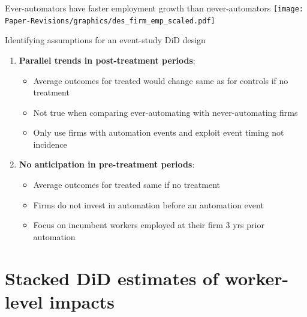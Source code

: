 \documentclass[aspectratio=169]{beamer}
\begin{document}
\begin{frame}{Ever-automators have faster employment growth than never-automators}
\centering
\texttt{[image: Paper-Revisions/graphics/des\_firm\_emp\_scaled.pdf]}
\end{frame}

\begin{frame}{Identifying assumptions for an event-study DiD design}
    \begin{enumerate}
        \item<1-> \textbf{Parallel trends in post-treatment periods}: \medskip
        \begin{itemize}
            \item Average outcomes for treated would change same as for controls if no treatment \medskip
            \item Not true when comparing ever-automating with never-automating firms \medskip
            \item Only use firms with automation events and exploit event timing not incidence \medskip
        \end{itemize}
        \item<2-> \textbf{No anticipation in pre-treatment periods}: \medskip
        \begin{itemize}
            \item Average outcomes for treated same if no treatment \medskip
            \item Firms do not invest in automation before an automation event \medskip
            \item Focus on incumbent workers employed at their firm 3 yrs prior automation
        \end{itemize}
    \end{enumerate}
\end{frame}

\section{Stacked DiD estimates of worker-level impacts}
\end{document}
